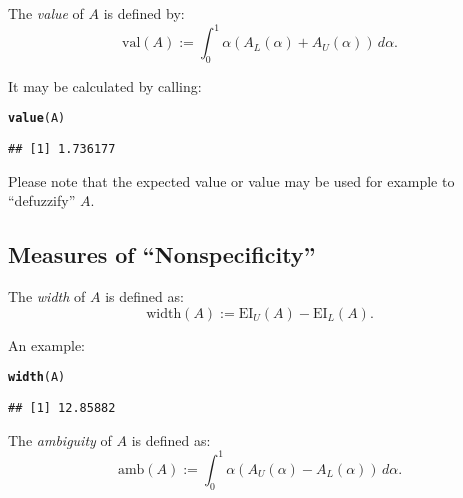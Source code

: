 \documentclass[11pt]{article}\usepackage{graphicx, color}
\makeatletter
\newcommand{\hlfunctioncall}[1]{\textcolor[rgb]{0.501960784313725,0,0.329411764705882}{\textbf{#1}}}%
\newenvironment{kframe}{%
 \def\at@end@of@kframe{}%
 \ifinner\ifhmode%
  \def\at@end@of@kframe{\end{minipage}}%
  \begin{minipage}{\columnwidth}%
 \fi\fi%
 \def\FrameCommand##1{\hskip\@totalleftmargin \hskip-\fboxsep
 \colorbox{shadecolor}{##1}\hskip-\fboxsep
     \hskip-\linewidth \hskip-\@totalleftmargin \hskip\columnwidth}%
 \MakeFramed {\advance\hsize-\width
   \@totalleftmargin\z@ \linewidth\hsize
   \@setminipage}}%
 {\par\unskip\endMakeFramed%
 \at@end@of@kframe}
\newenvironment{knitrout}{}{} %
\makeatother
\begin{document}
\bigskip
The \textit{value} of $A$ \cite{DelgadoETAL1998:canonicalfn} is defined by:
\begin{equation}
\mathrm{val}(A) := \int_0^1 \alpha\left(A_L(\alpha)+A_U(\alpha)\right)\,d\alpha.
\end{equation}

\noindent
It may be calculated by calling:

\begin{knitrout}\small
{}\color{fgcolor}\begin{kframe}
\begin{alltt}
\hlfunctioncall{value}(A)
\end{alltt}
\begin{verbatim}
## [1] 1.736177
\end{verbatim}
\end{kframe}
\end{knitrout}


\noindent
Please note that the expected value or  value
may be used for example to ``defuzzify'' $A$.


\subsection{Measures of ``Nonspecificity''}


The \textit{width} of $A$ \cite{Chanas2001:intervapproxfn} is defined as:
\begin{equation}
\mathrm{width}(A) := \mathrm{EI}_U(A) - \mathrm{EI}_L(A).
\end{equation}

\noindent
An example:

\begin{knitrout}\small
{}\color{fgcolor}\begin{kframe}
\begin{alltt}
\hlfunctioncall{width}(A)
\end{alltt}
\begin{verbatim}
## [1] 12.85882
\end{verbatim}
\end{kframe}
\end{knitrout}


\bigskip
The \textit{ambiguity} of $A$ \cite{DelgadoETAL1998:canonicalfn} is defined as:
\begin{equation}
\mathrm{amb}(A) := \int_0^1 \alpha\left(A_U(\alpha)-A_L(\alpha)\right)\,d\alpha.
\end{equation}
\end{document}
